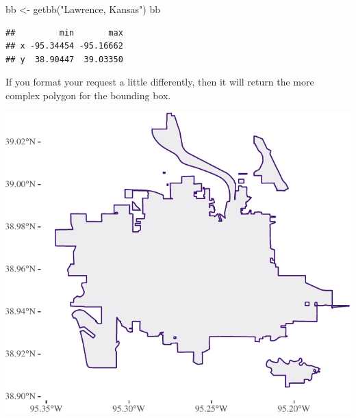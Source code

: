 \documentclass[
  paper=a4,
  ,captions=tableheading
]{scrartcl}
\newenvironment{Shaded}{\begin{snugshade}}{\end{snugshade}}
\newcommand{\AttributeTok}[1]{\textcolor[rgb]{0.77,0.63,0.00}{#1}}
\newcommand{\FunctionTok}[1]{\textcolor[rgb]{0.00,0.00,0.00}{#1}}
\newcommand{\NormalTok}[1]{#1}
\newcommand{\OtherTok}[1]{\textcolor[rgb]{0.56,0.35,0.01}{#1}}
\newcommand{\SpecialCharTok}[1]{\textcolor[rgb]{0.00,0.00,0.00}{#1}}
\newcommand{\StringTok}[1]{\textcolor[rgb]{0.31,0.60,0.02}{#1}}
\begin{document}
\begin{Shaded}
\begin{Highlighting}[]
\NormalTok{bb }\OtherTok{\textless{}{-}} \FunctionTok{getbb}\NormalTok{(}\StringTok{"Lawrence, Kansas"}\NormalTok{)}
\NormalTok{bb}
\end{Highlighting}
\end{Shaded}

\begin{verbatim}
##         min       max
## x -95.34454 -95.16662
## y  38.90447  39.03350
\end{verbatim}

If you format your request a little differently, then it will return the
more complex polygon for the bounding box.

\begin{Shaded}
\end{Shaded}

\includegraphics{Haskell_files/figure-latex/unnamed-chunk-8-1.pdf}
\end{document}
